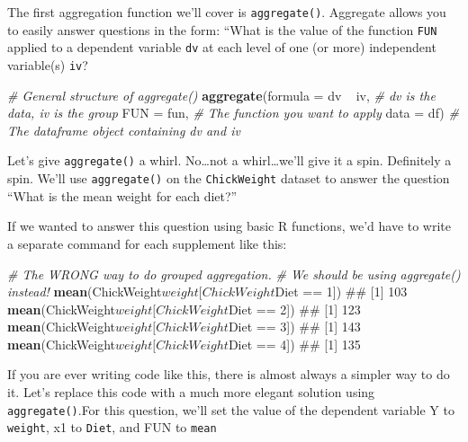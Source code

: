 \documentclass[]{book}
\newenvironment{Shaded}{\begin{snugshade}}{\end{snugshade}}
\newcommand{\KeywordTok}[1]{\textcolor[rgb]{0.13,0.29,0.53}{\textbf{{#1}}}}
\newcommand{\DataTypeTok}[1]{\textcolor[rgb]{0.13,0.29,0.53}{{#1}}}
\newcommand{\DecValTok}[1]{\textcolor[rgb]{0.00,0.00,0.81}{{#1}}}
\newcommand{\StringTok}[1]{\textcolor[rgb]{0.31,0.60,0.02}{{#1}}}
\newcommand{\CommentTok}[1]{\textcolor[rgb]{0.56,0.35,0.01}{\textit{{#1}}}}
\newcommand{\NormalTok}[1]{{#1}}
\theoremstyle{definition}
\theoremstyle{definition}
\theoremstyle{remark}
\begin{document}
The first aggregation function we'll cover is \texttt{aggregate()}.
Aggregate allows you to easily answer questions in the form: ``What is
the value of the function \texttt{FUN} applied to a dependent variable
\texttt{dv} at each level of one (or more) independent variable(s)
\texttt{iv}?

\begin{Shaded}
\begin{Highlighting}[]
\CommentTok{# General structure of aggregate()}
\KeywordTok{aggregate}\NormalTok{(}\DataTypeTok{formula =} \NormalTok{dv ~}\StringTok{ }\NormalTok{iv, }\CommentTok{# dv is the data, iv is the group }
          \DataTypeTok{FUN =} \NormalTok{fun, }\CommentTok{# The function you want to apply}
          \DataTypeTok{data =} \NormalTok{df) }\CommentTok{# The dataframe object containing dv and iv}
\end{Highlighting}
\end{Shaded}

Let's give \texttt{aggregate()} a whirl. No\ldots{}not a
whirl\ldots{}we'll give it a spin. Definitely a spin. We'll use
\texttt{aggregate()} on the \texttt{ChickWeight} dataset to answer the
question ``What is the mean weight for each diet?''

If we wanted to answer this question using basic R functions, we'd have
to write a separate command for each supplement like this:

\begin{Shaded}
\begin{Highlighting}[]
\CommentTok{# The WRONG way to do grouped aggregation. }
\CommentTok{#  We should be using aggregate() instead!}
\KeywordTok{mean}\NormalTok{(ChickWeight$weight[ChickWeight$Diet ==}\StringTok{ }\DecValTok{1}\NormalTok{])}
\NormalTok{## [1] 103}
\KeywordTok{mean}\NormalTok{(ChickWeight$weight[ChickWeight$Diet ==}\StringTok{ }\DecValTok{2}\NormalTok{])}
\NormalTok{## [1] 123}
\KeywordTok{mean}\NormalTok{(ChickWeight$weight[ChickWeight$Diet ==}\StringTok{ }\DecValTok{3}\NormalTok{])}
\NormalTok{## [1] 143}
\KeywordTok{mean}\NormalTok{(ChickWeight$weight[ChickWeight$Diet ==}\StringTok{ }\DecValTok{4}\NormalTok{])}
\NormalTok{## [1] 135}
\end{Highlighting}
\end{Shaded}

If you are ever writing code like this, there is almost always a simpler
way to do it. Let's replace this code with a much more elegant solution
using \texttt{aggregate()}.For this question, we'll set the value of the
dependent variable Y to \texttt{weight}, x1 to \texttt{Diet}, and FUN to
\texttt{mean}
\end{document}

